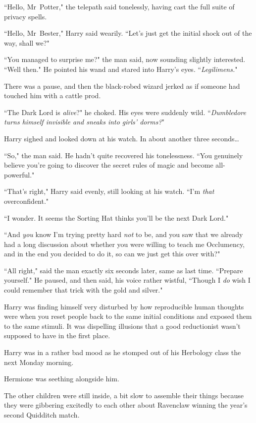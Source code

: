 ``Hello, Mr~Potter," the telepath said tonelessly, having cast the full suite of privacy spells.

``Hello, Mr~Bester," Harry said wearily. ``Let's just get the initial shock out of the way, shall we?"

``You managed to surprise me?" the man said, now sounding slightly interested. ``Well then." He pointed his wand and stared into Harry's eyes. ``\emph{Legilimens.}"

There was a pause, and then the black-robed wizard jerked as if someone had touched him with a cattle prod.

``The Dark Lord is \emph{alive}?" he choked. His eyes were suddenly wild. ``\emph{Dumbledore turns himself invisible and sneaks into girls' dorms?}"

Harry sighed and looked down at his watch. In about another three seconds{\ldots}

``So," the man said. He hadn't quite recovered his tonelessness. ``You genuinely believe you're going to discover the secret rules of magic and become all-powerful."

``That's right," Harry said evenly, still looking at his watch. ``I'm \emph{that} overconfident."

``I wonder. It seems the Sorting Hat thinks you'll be the next Dark Lord."

``And \emph{you} know I'm trying pretty hard \emph{not} to be, and you saw that we already had a long discussion about whether you were willing to teach me Occlumency, and in the end you decided to do it, so can we just get this over with?"

``All right," said the man exactly six seconds later, same as last time. ``Prepare yourself." He paused, and then said, his voice rather wistful, ``Though I \emph{do} wish I could remember that trick with the gold and silver."

Harry was finding himself very disturbed by how reproducible human thoughts were when you reset people back to the same initial conditions and exposed them to the same stimuli. It was dispelling illusions that a good reductionist wasn't supposed to have in the first place.

\later

Harry was in a rather bad mood as he stomped out of his Herbology class the next Monday morning.

Hermione was seething alongside him.

The other children were still inside, a bit slow to assemble their things because they were gibbering excitedly to each other about Ravenclaw winning the year's second Quidditch match.

